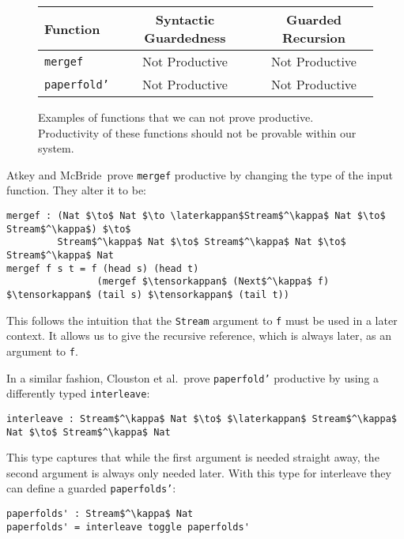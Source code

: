 \begin{figure}[h]
\begin{center}
  \begin{tabular}{| l | c | c |} \hline
    Function & Syntactic Guardedness & Guarded Recursion \\ \hline
    \texttt{mergef} & Not Productive & Not Productive \\ \hline
    \texttt{paperfold'} & Not Productive & Not Productive \\ \hline
  \end{tabular}
\end{center}
  \caption{Examples of functions that we can not prove productive. Productivity
    of these functions should not be provable within our system.}
  \label{fig:productivity_table_3}
\end{figure}

Atkey and McBride\,\citep{Atkey:2013} prove \texttt{mergef} productive by
changing the type of the input function. They alter it to be:

\begin{lstlisting}[mathescape]
mergef : (Nat $\to$ Nat $\to \laterkappan$Stream$^\kappa$ Nat $\to$ Stream$^\kappa$) $\to$
         Stream$^\kappa$ Nat $\to$ Stream$^\kappa$ Nat $\to$ Stream$^\kappa$ Nat
mergef f s t = f (head s) (head t) 
                (mergef $\tensorkappan$ (Next$^\kappa$ f) $\tensorkappan$ (tail s) $\tensorkappan$ (tail t))
\end{lstlisting}

This follows the intuition that the \texttt{Stream} argument to \texttt{f} must be used in a
later context. It allows us to give the recursive reference, which is always
later, as an argument to \texttt{f}.

In a similar fashion, Clouston et al.\,\citep{BirkedalL:guarded-lambda-conf}
prove \texttt{paperfold'} productive by using a differently typed \texttt{interleave}:

\begin{lstlisting}[mathescape]
interleave : Stream$^\kappa$ Nat $\to$ $\laterkappan$ Stream$^\kappa$ Nat $\to$ Stream$^\kappa$ Nat
\end{lstlisting}

This type captures that while the first argument is needed straight away, the
second argument is always only needed later. With this type for interleave they
can define a guarded \texttt{paperfolds'}:

\begin{lstlisting}[mathescape]
paperfolds' : Stream$^\kappa$ Nat
paperfolds' = interleave toggle paperfolds'
\end{lstlisting}


